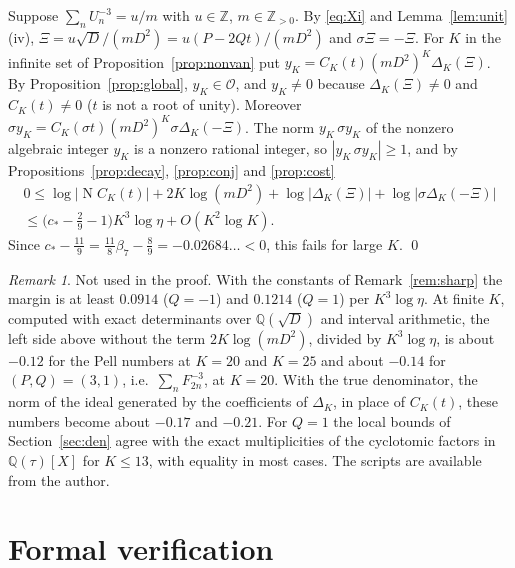 \documentclass[11pt]{amsart}
\theoremstyle{definition}
\theoremstyle{remark}
\newtheorem{remark}[theorem]{Remark}
\numberwithin{equation}{section}
\newcommand{\ZZ}{\mathbb{Z}}
\newcommand{\QQ}{\mathbb{Q}}
\newcommand{\cO}{\mathcal{O}}
\newcommand{\Nm}{\operatorname{N}}
\begin{document}
Suppose $\sum_nU_n^{-3}=u/m$ with $u\in\ZZ$, $m\in\ZZ_{>0}$. By \eqref{eq:Xi} and Lemma~\ref{lem:unit}(iv),
$\Xi=u\sqrt D/(mD^2)=u(P-2Qt)/(mD^2)$ and $\sigma\Xi=-\Xi$. For $K$ in the infinite set of Proposition~\ref{prop:nonvan}
put $y_K=C_K(t)(mD^2)^K\Delta_K(\Xi)$. By Proposition~\ref{prop:global}, $y_K\in\cO$, and $y_K\ne0$ because
$\Delta_K(\Xi)\ne0$ and $C_K(t)\ne0$ ($t$ is not a root of unity). Moreover
$\sigma y_K=C_K(\sigma t)(mD^2)^K\sigma\Delta_K(-\Xi)$. The norm $y_K\,\sigma y_K$ of the nonzero algebraic integer $y_K$
is a nonzero rational integer, so $|y_K\,\sigma y_K|\ge1$, and by Propositions~\ref{prop:decay}, \ref{prop:conj} and
\ref{prop:cost}
\begin{multline*}
0\le\log|\Nm C_K(t)|+2K\log(mD^2)+\log|\Delta_K(\Xi)|+\log|\sigma\Delta_K(-\Xi)|\\
\le\bigl(c_*-\tfrac29-1\bigr)K^3\log\eta+O(K^2\log K).
\end{multline*}
Since $c_*-\tfrac{11}9=\tfrac{11}8\beta_7-\tfrac89=-0.02684\ldots<0$, this fails for large $K$. \qed

\begin{remark}
Not used in the proof. With the constants of Remark~\ref{rem:sharp} the margin is at least $0.0914$ ($Q=-1$) and
$0.1214$ ($Q=1$) per $K^3\log\eta$. At finite $K$, computed with exact determinants over $\QQ(\sqrt D)$ and interval
arithmetic, the left side above without the term $2K\log(mD^2)$, divided by $K^3\log\eta$, is about $-0.12$ for the Pell
numbers at $K=20$ and $K=25$ and about $-0.14$ for $(P,Q)=(3,1)$, i.e.\ $\sum_nF_{2n}^{-3}$, at $K=20$. With the true
denominator, the norm of the ideal generated by the coefficients of $\Delta_K$, in place of $C_K(t)$, these numbers
become about $-0.17$ and $-0.21$. For $Q=1$ the local bounds of Section~\ref{sec:den} agree with the exact multiplicities
of the cyclotomic factors in $\QQ(\tau)[X]$ for $K\le13$, with equality in most cases. The scripts are available from the
author.
\end{remark}

\section{Formal verification}\label{sec:lean}
\end{document}
